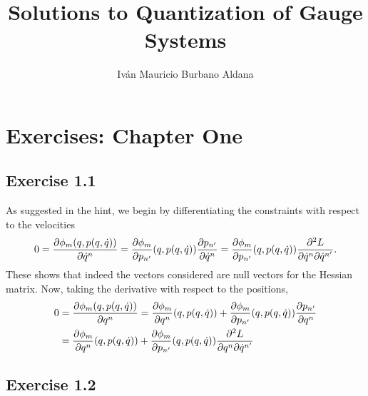 \documentclass{book}
\title{Solutions to Quantization of Gauge Systems}
\author{Iván Mauricio Burbano Aldana}
\begin{document}
\chapter{Exercises: Chapter One}

\section*{Exercise 1.1} 

As suggested in the hint, we begin by differentiating the constraints with respect to the velocities
\begin{equation}
0=\pdv{\phi_m(q,p(q,\dot{q}))}{\dot{q}^n}=\pdv{\phi_m}{p_{n'}}\qty(q,p(q,\dot{q}))\pdv{p_{n'}}{\dot{q}^n}=\pdv{\phi_m}{p_{n'}}\qty(q,p(q,\dot{q}))\pdv{L}{\dot{q}^n}{\dot{q}^{n'}}.
\end{equation}
These shows that indeed the vectors considered are null vectors for the Hessian matrix. Now, taking the derivative with respect to the positions,
\begin{equation}
\begin{aligned}
0&=\pdv{\phi_m(q,p(q,\dot{q}))}{q^n}=\pdv{\phi_m}{q^n}\qty(q,p(q,\dot{q}))+\pdv{\phi_m}{p_{n'}}\qty(q,p(q,\dot{q}))\pdv{p_{n'}}{q^n}\\
&=\pdv{\phi_m}{q^n}\qty(q,p(q,\dot{q}))+\pdv{\phi_m}{p_{n'}}\qty(q,p(q,\dot{q}))\pdv{L}{q^n}{\dot{q}^{n'}}
\end{aligned}
\end{equation}

\section*{Exercise 1.2}
\end{document}

